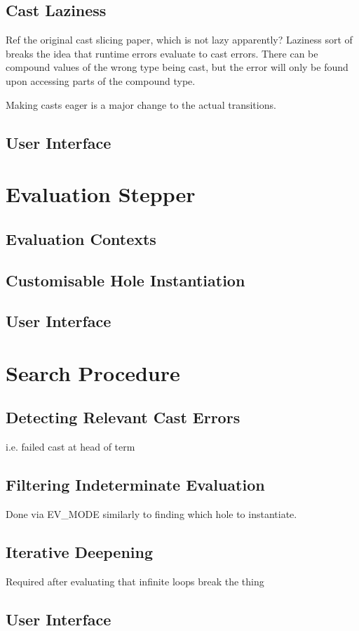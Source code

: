 \subsection{Cast Laziness}\label{sec:CastLaziness}
Ref the original cast slicing paper, which is not lazy apparently? Laziness sort of breaks the idea that runtime errors evaluate to cast errors. There can be compound values of the wrong type being cast, but the error will only be found upon accessing parts of the compound type.

Making casts eager is a major change to the actual transitions.



\subsection{User Interface}

\section{Evaluation Stepper}\label{sec:Stepper}
\subsection{Evaluation Contexts}
\subsection{Customisable Hole Instantiation}
\subsection{User Interface}


\section{Search Procedure}\label{sec:SearchProcedure}
\subsection{Detecting Relevant Cast Errors}
i.e. failed cast at head of term
\subsection{Filtering Indeterminate Evaluation}
Done via EV\_MODE similarly to finding which hole to instantiate.

\subsection{Iterative Deepening}\label{sec:IterativeDeepening}
Required after evaluating that infinite loops break the thing
\subsection{User Interface}


